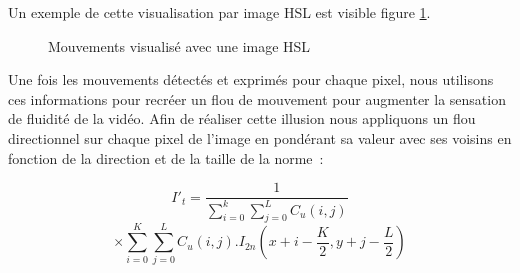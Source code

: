 \documentclass[fleqn,10pt]{SelfArx} %
\begin{document}
Un exemple de cette visualisation par image HSL est visible figure \ref{hsl}.
\begin{figure}[!ht]%
    \centering
    \hspace{0.030\textwidth}
    \hspace{0.030\textwidth}
    \caption{Mouvements visualisé avec une image HSL}
    \label{hsl}
\end{figure}

Une fois les mouvements détectés et exprimés pour chaque pixel, nous utilisons ces informations pour recréer
un flou de mouvement pour augmenter la sensation de fluidité de la vidéo.
Afin de réaliser cette illusion nous appliquons un flou directionnel sur chaque pixel de l'image en pondérant
sa valeur avec ses voisins en fonction de la direction et de la taille de la norme~:

\[
	I'_{t} = \frac{1}{\sum^{k}_{i=0}\sum^{L}_{j=0}C_{u}(i,j)}
\]
\[
	\times \sum^{K}_{i=0}\sum^{L}_{j=0} C_{u}(i,j).I_{2n}(x+i-\frac{K}{2}, y+j-\frac{L}{2})
\]
\end{document}
